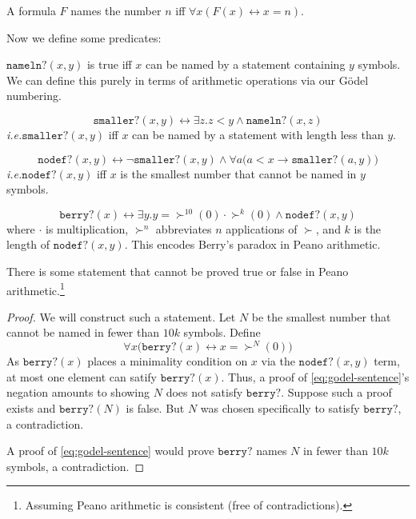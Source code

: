 \documentclass{scrbook}
\renewcommand{\implies}{\to}
\renewcommand{\iff}{\leftrightarrow}
\newcommand{\ie}{\emph{i.e.}\xspace}
\begin{document}
\begin{defn}[names]
  A formula $F$ names the number $n$ iff $\forall x (F(x)\iff x=n)$. 
\end{defn}
Now we define some predicates:
\newcommand{\namelen}{\texttt{nameln?}}
\begin{defn}[\namelen]
  $\namelen(x,y)$ is true iff $x$ can be named by a statement containing $y$ symbols. We can define this purely in terms of arithmetic operations via our Gödel numbering. 
\end{defn}
\newcommand{\namesmaller}{\texttt{smaller?}}
\begin{defn}[\namesmaller]
  \[
  \namesmaller(x,y)\iff \exists z .z < y \wedge \namelen(x,z)
  \]
  \ie $\namesmaller(x,y)$ iff $x$ can be named by a statement with length less than $y$. 
\end{defn}
\newcommand{\minnodef}{\texttt{nodef?}}
\begin{defn}[\minnodef]
  \[
  \minnodef(x,y)\iff \neg \namesmaller(x,y) \wedge \forall a \bigl(a < x \implies \namesmaller(a,y)\bigr)
  \]
  \ie $\minnodef(x,y)$ iff $x$ is the smallest number that cannot be named in $y$ symbols. 
\end{defn}
\newcommand{\berry}{\texttt{berry?}}
\begin{defn}[\berry]
  \[
  \berry(x) \iff\exists y. y=\succ^{10}(0)\cdot \succ^{k}(0)\wedge \minnodef(x,y)
  \]
  where $\cdot$ is multiplication, $\succ^n$ abbreviates $n$ applications of $\succ$, and $k$ is the length of $\minnodef(x,y)$.
  This encodes Berry's paradox in Peano arithmetic. 
\end{defn}
\begin{theorem}
  There is some statement that cannot be proved true or false in Peano arithmetic.\footnote{Assuming Peano arithmetic is consistent (free of contradictions).}
\end{theorem}
\begin{proof}
  We will construct such a statement. Let $N$ be the smallest number that cannot be named in fewer than $10k$ symbols. Define 
  \begin{equation}
    \label{eq:godel-sentence}
    \forall x \bigl(\berry (x) \iff x= \succ^N(0)\bigr)
  \end{equation}
  As $\berry(x)$ places a minimality condition on $x$ via the $\minnodef(x,y)$ term, at most one element can satify $\berry(x)$. Thus, 
  a proof of \cref{eq:godel-sentence}'s negation amounts to showing $N$ does not satisfy $\berry$. Suppose such a proof exists and $\berry(N)$ is false. But $N$ was chosen specifically to satisfy $\berry$, a contradiction.

  A proof of \cref{eq:godel-sentence} would prove $\berry$ names $N$ in fewer than $10k$ symbols, a contradiction. 
\end{proof}
\end{document}
